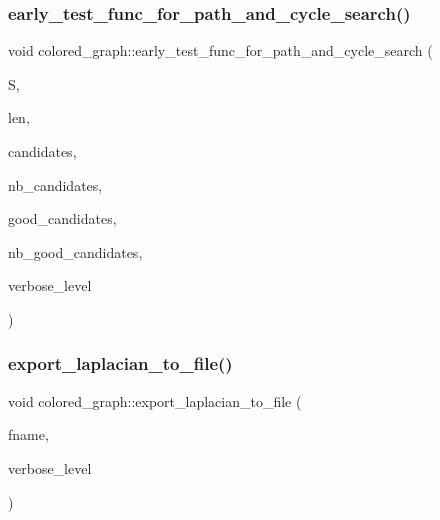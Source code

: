 \subsubsection{\texorpdfstring{early\+\_\+test\+\_\+func\+\_\+for\+\_\+path\+\_\+and\+\_\+cycle\+\_\+search()}{early\_test\_func\_for\_path\_and\_cycle\_search()}}
{\footnotesize\ttfamily void colored\+\_\+graph\+::early\+\_\+test\+\_\+func\+\_\+for\+\_\+path\+\_\+and\+\_\+cycle\+\_\+search (\begin{DoxyParamCaption}\item[{\mbox{\hyperlink{galois_8h_a09fddde158a3a20bd2dcadb609de11dc}{I\+NT}} $\ast$}]{S,  }\item[{\mbox{\hyperlink{galois_8h_a09fddde158a3a20bd2dcadb609de11dc}{I\+NT}}}]{len,  }\item[{\mbox{\hyperlink{galois_8h_a09fddde158a3a20bd2dcadb609de11dc}{I\+NT}} $\ast$}]{candidates,  }\item[{\mbox{\hyperlink{galois_8h_a09fddde158a3a20bd2dcadb609de11dc}{I\+NT}}}]{nb\+\_\+candidates,  }\item[{\mbox{\hyperlink{galois_8h_a09fddde158a3a20bd2dcadb609de11dc}{I\+NT}} $\ast$}]{good\+\_\+candidates,  }\item[{\mbox{\hyperlink{galois_8h_a09fddde158a3a20bd2dcadb609de11dc}{I\+NT}} \&}]{nb\+\_\+good\+\_\+candidates,  }\item[{\mbox{\hyperlink{galois_8h_a09fddde158a3a20bd2dcadb609de11dc}{I\+NT}}}]{verbose\+\_\+level }\end{DoxyParamCaption})}

\mbox{\label{classcolored__graph_a497d62a41adacc9650c83f6d8629608b}} 
\subsubsection{\texorpdfstring{export\+\_\+laplacian\+\_\+to\+\_\+file()}{export\_laplacian\_to\_file()}}
{\footnotesize\ttfamily void colored\+\_\+graph\+::export\+\_\+laplacian\+\_\+to\+\_\+file (\begin{DoxyParamCaption}\item[{const \mbox{\hyperlink{galois_8h_ab6cc7b4aeb6ea31aba2b3fbfc83ff5e6}{B\+Y\+TE}} $\ast$}]{fname,  }\item[{\mbox{\hyperlink{galois_8h_a09fddde158a3a20bd2dcadb609de11dc}{I\+NT}}}]{verbose\+\_\+level }\end{DoxyParamCaption})}

